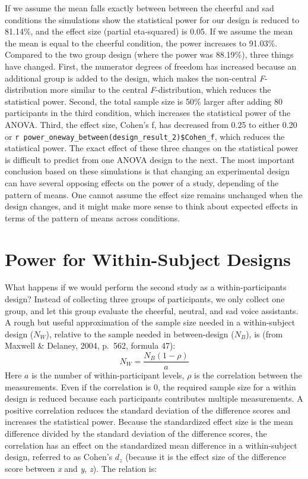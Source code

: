 \documentclass[,jou,floatsintext]{apa6}
\begin{document}
If we assume the mean falls exactly between between the cheerful and sad conditions the simulations show the statistical power for our design is reduced to 81.14\%, and the effect size (partial eta-squared) is 0.05.
If we assume the mean the mean is equal to the cheerful condition, the power increases to 91.03\%.
Compared to the two group design (where the power was 88.19\%), three things have changed.
First, the numerator degrees of freedom has increased because an additional group is added to the design, which makes the non-central \emph{F}-distribution more similar to the central \emph{F}-distribution, which reduces the statistical power.
Second, the total sample size is 50\% larger after adding 80 participants in the third condition, which increases the statistical power of the ANOVA.
Third, the effect size, Cohen's f, has decreased from 0.25 to either 0.20 or \texttt{r\ power\_oneway\_between(design\_result\_2)\$Cohen\_f}, which reduces the statistical power.
The exact effect of these three changes on the statistical power is difficult to predict from one ANOVA design to the next.
The most important conclusion based on these simulations is that changing an experimental design can have several opposing effects on the power of a study, depending of the pattern of means.
One cannot assume the effect size remains unchanged when the design changes, and it might make more sense to think about expected effects in terms of the pattern of means across conditions.

\hypertarget{power-for-within-subject-designs}{%
\section{Power for Within-Subject Designs}\label{power-for-within-subject-designs}}

What happens if we would perform the second study as a within-participants design?
Instead of collecting three groups of participants, we only collect one group, and let this group evaluate the cheerful, neutral, and sad voice assistants.
A rough but useful approximation of the sample size needed in a within-subject design (\(N_W\)), relative to the sample needed in between-design (\(N_B\)), is (from Maxwell \& Delaney, 2004, p.~562, formula 47):
\begin{equation}
N_{W}=\frac{N_{B}(1-\rho)}{a} \label{eq:within-n}
\end{equation}
Here \(a\) is the number of within-participant levels, \(\rho\) is the correlation between the measurements.
Even if the correlation is 0, the required sample size for a within design is reduced because each participants contributes multiple measurements.
A positive correlation reduces the standard deviation of the difference scores and increases the statistical power.
Because the standardized effect size is the mean difference divided by the standard deviation of the difference scores, the correlation has an effect on the standardized mean difference in a within-subject design, referred to as Cohen's \(d_z\) (because it is the effect size of the difference score between \emph{x} and \emph{y}, \emph{z}). The relation is:
\end{document}
